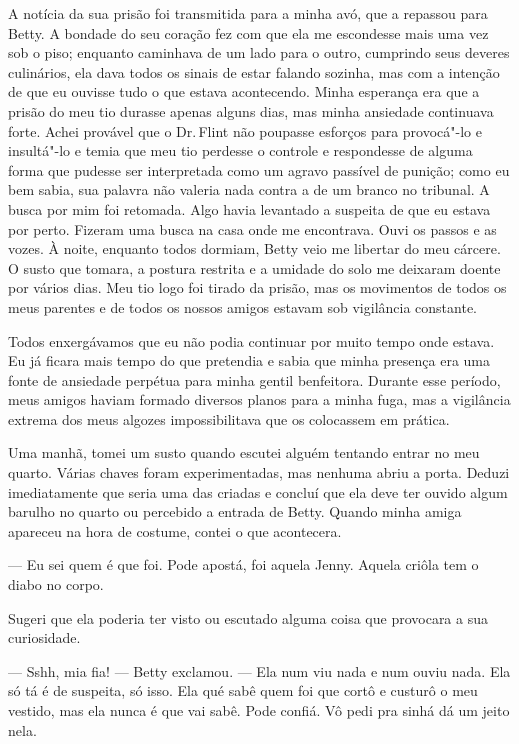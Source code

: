 A notícia da sua prisão foi transmitida
para a minha avó, que a repassou para Betty. A bondade do seu coração
fez com que ela me escondesse mais uma vez sob o piso; enquanto
caminhava de um lado para o outro, cumprindo seus deveres culinários,
ela dava todos os sinais de estar falando sozinha, mas com a intenção de
que eu ouvisse tudo o que estava acontecendo. Minha esperança era que a
prisão do meu tio durasse apenas alguns dias, mas minha ansiedade
continuava forte. Achei provável que o Dr.\,Flint não poupasse esforços
para provocá"-lo e insultá"-lo e temia que meu tio perdesse o controle e
respondesse de alguma forma que pudesse ser interpretada como um agravo
passível de punição; como eu bem sabia, sua palavra não valeria nada
contra a de um branco no tribunal. A busca por mim foi retomada. Algo
havia levantado a suspeita de que eu estava por perto. Fizeram uma busca
na casa onde me encontrava. Ouvi os passos e as vozes. À noite, enquanto
todos dormiam, Betty veio me libertar do meu cárcere. O susto que
tomara, a postura restrita e a umidade do solo me deixaram doente por
vários dias. Meu tio logo foi tirado da prisão, mas os movimentos de
todos os meus parentes e de todos os nossos amigos estavam sob
vigilância constante.

Todos enxergávamos que eu não podia
continuar por muito tempo onde estava. Eu já ficara mais tempo do que
pretendia e sabia que minha presença era uma fonte de ansiedade perpétua
para minha gentil benfeitora. Durante esse período, meus amigos haviam
formado diversos planos para a minha fuga, mas a vigilância extrema dos
meus algozes impossibilitava que os colocassem em prática.

Uma manhã, tomei um susto quando
escutei alguém tentando entrar no meu quarto. Várias chaves foram
experimentadas, mas nenhuma abriu a porta. Deduzi imediatamente que
seria uma das criadas e concluí que ela deve ter ouvido algum barulho no
quarto ou percebido a entrada de Betty. Quando minha amiga apareceu na
hora de costume, contei o que acontecera.

--- Eu sei quem é que foi. Pode apostá, foi aquela Jenny. Aquela criôla
tem o diabo no corpo.

Sugeri que ela poderia ter visto ou escutado alguma coisa que provocara
a sua curiosidade.

--- Sshh, mia fia! --- Betty exclamou.
--- Ela num viu nada e num ouviu nada. Ela só tá é de suspeita, só isso.
Ela qué sabê quem foi que cortô e custurô o meu vestido, mas ela nunca é
que vai sabê. Pode confiá. Vô pedi pra sinhá dá um jeito nela.

